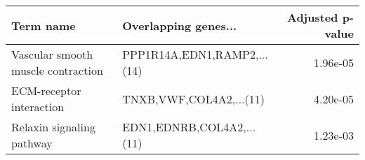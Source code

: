 \begin{tabular}{llr}
\toprule
                         Term name &        Overlapping genes... &  Adjusted p-value \\
\midrule
Vascular smooth muscle contraction & PPP1R14A,EDN1,RAMP2,...(14) &          1.96e-05 \\
          ECM-receptor interaction &     TNXB,VWF,COL4A2,...(11) &          4.20e-05 \\
         Relaxin signaling pathway &   EDN1,EDNRB,COL4A2,...(11) &          1.23e-03 \\
\bottomrule
\end{tabular}
